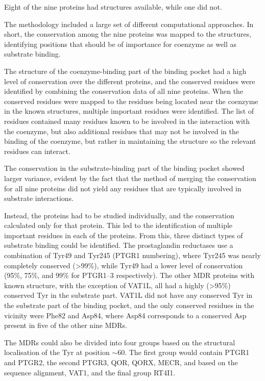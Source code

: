 \documentclass[a4paper, twoside, 12pt, openright]{report}
\begin{document}
Eight of the nine proteins had structures available, while one did not.

The methodology included a large set of different computational approaches. In short, the conservation among the nine proteins was mapped to the structures, identifying positions that should be of importance for coenzyme as well as substrate binding.

The structure of the coenzyme-binding part of the binding pocket had a high level of conservation over the different proteins, and the conserved residues were identified by combining the conservation data of all nine proteins. When the conserved residues were mapped to the residues being located near the coenzyme in the known structures, multiple important residues were identified. The list of residues contained many residues known to be involved in the interaction with the coenzyme, but also additional residues that may not be involved in the binding of the coenzyme, but rather in maintaining the structure so the relevant residues can interact.

The conservation in the substrate-binding part of the binding pocket showed larger variance, evident by the fact that the method of merging the conservation for all nine proteins did not yield any residues that are typically involved in substrate interactions.

Instead, the proteins had to be studied individually, and the conservation calculated only for that protein. This led to the identification of multiple important residues in each of the proteins. From this, three distinct types of substrate binding could be identified. The prostaglandin reductases use a combination of Tyr49 and Tyr245 (PTGR1 numbering), where Tyr245 was nearly completely conserved (>99\%), while Tyr49 had a lower level of conservation (95\%, 75\%, and 99\% for PTGR1--3 respectively). The other MDR proteins with known structure, with the exception of VAT1L, all had a highly (>95\%) conserved Tyr in the substrate part. VAT1L did not have any conserved Tyr in the substrate part of the binding pocket, and the only conserved residues in the vicinity were Phe82 and Asp84, where Asp84 corresponds to a conserved Asp present in five of the other nine MDRs.

The MDRs could also be divided into four groups based on the structural localisation of the Tyr at position $\sim$60. The first group would contain PTGR1 and PTGR2, the second PTGR3, QOR, QORX, MECR, and based on the sequence alignment, VAT1, and the final group RT4I1.
\end{document}
